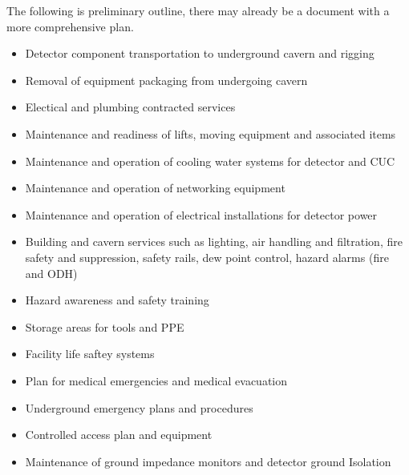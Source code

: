 The following is preliminary outline, there may already be a document
with a more comprehensive plan.
\begin{itemize}
\item Detector component transportation to underground cavern and rigging
\item Removal of equipment packaging from undergoing cavern
\item Electical and plumbing contracted services
\item Maintenance and readiness of lifts, moving equipment and associated items
\item Maintenance and operation of cooling water systems for detector and CUC
\item Maintenance and operation of networking equipment
\item Maintenance and operation of electrical installations for detector power
\item Building and cavern services such as lighting, air handling and
  filtration, fire safety and suppression, safety rails, dew point
  control, hazard alarms (fire and ODH)
\item Hazard awareness and safety training
\item Storage areas for tools and PPE
\item Facility life saftey systems
\item Plan for medical emergencies and medical evacuation
\item Underground emergency plans and procedures
\item Controlled access plan and equipment
\item Maintenance of ground impedance monitors and detector ground Isolation
\end{itemize}


